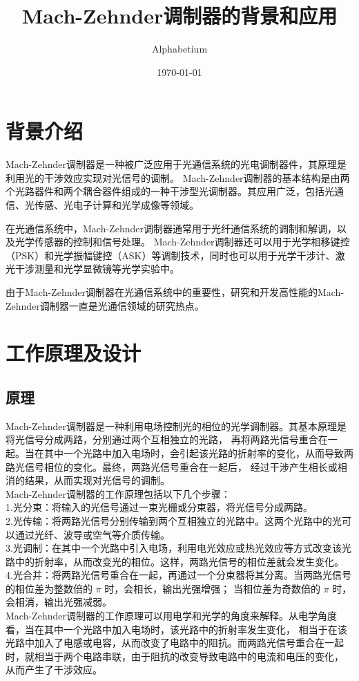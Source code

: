 \documentclass[12pt, a4paper, oneside]{article}
\title{Mach-Zehnder调制器的背景和应用}
\date{\today}
\author{Alphabetium}
\begin{document}
\begin{spacing}{2.0}
\tableofcontents
\maketitle


\section{背景介绍}

Mach-Zehnder调制器是一种被广泛应用于光通信系统的光电调制器件，其原理是利用光的干涉效应实现对光信号的调制。
Mach-Zehnder调制器的基本结构是由两个光路器件和两个耦合器件组成的一种干涉型光调制器。其应用广泛，包括光通信、光传感、光电子计算和光学成像等领域。

在光通信系统中，Mach-Zehnder调制器通常用于光纤通信系统的调制和解调，以及光学传感器的控制和信号处理。
Mach-Zehnder调制器还可以用于光学相移键控（PSK）和光学振幅键控（ASK）等调制技术，同时也可以用于光学干涉计、激光干涉测量和光学显微镜等光学实验中。

由于Mach-Zehnder调制器在光通信系统中的重要性，研究和开发高性能的Mach-Zehnder调制器一直是光通信领域的研究热点。


\section{工作原理及设计}
\subsection{原理}
Mach-Zehnder调制器是一种利用电场控制光的相位的光学调制器。其基本原理是将光信号分成两路，分别通过两个互相独立的光路，
再将两路光信号重合在一起。当在其中一个光路中加入电场时，会引起该光路的折射率的变化，从而导致两路光信号相位的变化。最终，两路光信号重合在一起后，
经过干涉产生相长或相消的结果，从而实现对光信号的调制。
\\
Mach-Zehnder调制器的工作原理包括以下几个步骤：
\\
1.光分束：将输入的光信号通过一束光栅或分束器，将光信号分成两路。
\\
2.光传输：将两路光信号分别传输到两个互相独立的光路中。这两个光路中的光可以通过光纤、波导或空气等介质传输。
\\
3.光调制：在其中一个光路中引入电场，利用电光效应或热光效应等方式改变该光路中的折射率，从而改变光的相位。这样，两路光信号的相位差就会发生变化。
\\
4.光合并：将两路光信号重合在一起，再通过一个分束器将其分离。当两路光信号的相位差为整数倍的 $\pi$ 时，会相长，输出光强增强；
当相位差为奇数倍的 $\pi$ 时，会相消，输出光强减弱。
\\
Mach-Zehnder调制器的工作原理可以用电学和光学的角度来解释。从电学角度看，当在其中一个光路中加入电场时，该光路中的折射率发生变化，
相当于在该光路中加入了电感或电容，从而改变了电路中的阻抗。而两路光信号重合在一起时，就相当于两个电路串联，由于阻抗的改变导致电路中的电流和电压的变化，
从而产生了干涉效应。


\end{spacing}
\end{document}
